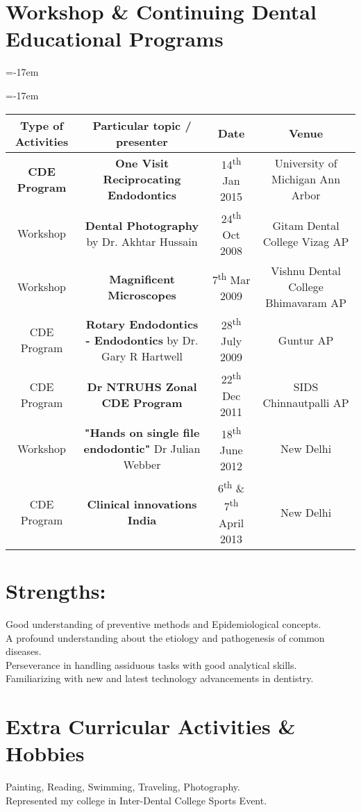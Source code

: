 \documentclass[]{friggeri-cv} %
\newcommand{\negparr}[1][-17em]{%
  \ifvmode\else\par\fi
  {\parindent=#1\leavevmode}\ignorespaces
}
\begin{document}
\newpage
\section{Workshop \& Continuing Dental Educational Programs}
\negparr

\negparr
\begin{tabular}{|c |c |c |c|}
\hline
    {\bf Type of Activities}	&	{\bf Particular topic / presenter}		&	{\bf Date}	&	 {\bf Venue}\\
\hline
    {\bf CDE Program}	&	{\bf One Visit Reciprocating Endodontics}		&	{ 14\textsuperscript{th} Jan 2015}	&	{University of Michigan Ann Arbor} \\
\hline
Workshop		&	{\bf Dental Photography} by Dr. Akhtar Hussain	&	24\textsuperscript{th} Oct 2008		&	Gitam Dental College Vizag AP\\
\hline
Workshop		&	{\bf Magnificent Microscopes}	&	7\textsuperscript{th} Mar 2009	&	Vishnu Dental College Bhimavaram AP\\
\hline
CDE	Program	& 	{\bf Rotary Endodontics - Endodontics} by Dr. Gary R Hartwell	& 28\textsuperscript{th} July 2009	&	Guntur AP\\
\hline
CDE Program	&	{\bf Dr NTRUHS Zonal CDE Program}	& 22\textsuperscript{th} Dec 2011	&	SIDS Chinnautpalli AP\\
\hline
Workshop		&	{\bf "Hands on single file endodontic"} Dr Julian Webber	& 18\textsuperscript{th} June 2012	&	New Delhi\\
\hline
CDE Program	&	{\bf Clinical innovations India}	&	6\textsuperscript{th} \& 7\textsuperscript{th} April 2013	&	New Delhi\\
\hline
\end{tabular}

\section{Strengths:}
Good understanding of preventive methods and Epidemiological concepts.\\
A profound understanding about the etiology and pathogenesis of common diseases.\\
Perseverance in handling assiduous tasks with good analytical skills.\\
Familiarizing with new and latest technology advancements in dentistry.

\section{Extra Curricular Activities \& Hobbies }
Painting, Reading, Swimming, Traveling, Photography.\\
Represented my college in Inter-Dental College Sports Event.
\end{document}
